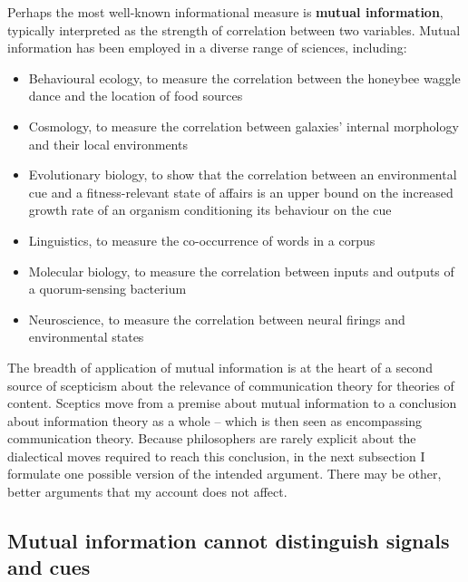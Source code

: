 \documentclass[12pt]{article}
\begin{document}


Perhaps the most well-known informational measure is \textbf{mutual information}, typically interpreted as the strength of correlation between two variables.
Mutual information has been employed in a diverse range of sciences, including:

\begin{itemize}
    \item Behavioural ecology, to measure the correlation between the honeybee waggle dance and the location of food sources \citep{haldane1954statistical}
    \item Cosmology, to measure the correlation between galaxies' internal morphology and their local environments \citep{pandey2017how}
    \item Evolutionary biology, to show that the correlation between an environmental cue and a fitness-relevant state of affairs is an upper bound on the increased growth rate of an organism conditioning its behaviour on the cue \citep{donaldson-matasci2010fitness}
    \item Linguistics, to measure the co-occurrence of words in a corpus \citep[$\S$4]{hunston2002corpora}
    \item Molecular biology, to measure the correlation between inputs and outputs of a quorum-sensing bacterium \citep{mehta2009information}
    \item Neuroscience, to measure the correlation between neural firings and environmental states \citep[][and references therein]{rathkopf2017neural}
\end{itemize}

\noindent The breadth of application of mutual information is at the heart of a second source of scepticism about the relevance of communication theory for theories of content.
Sceptics move from a premise about mutual information to a conclusion about information theory as a whole -- which is then seen as encompassing communication theory.
Because philosophers are rarely explicit about the dialectical moves required to reach this conclusion, in the next subsection I formulate one possible version of the intended argument.
There may be other, better arguments that my account does not affect.

\subsection{Mutual information cannot distinguish signals and cues}
\end{document}
